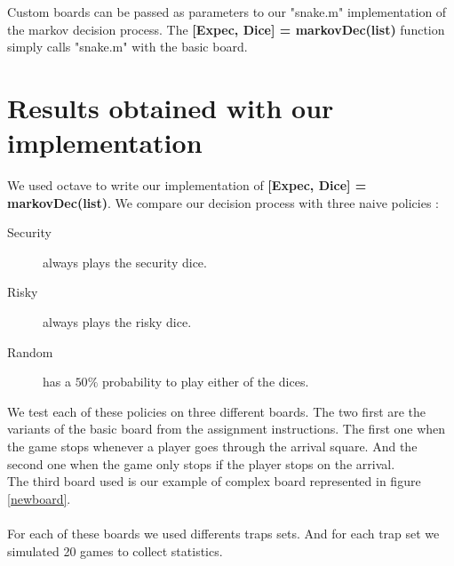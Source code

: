 \documentclass{eplDoc}
\begin{document}
Custom boards can be passed as parameters to our "snake.m" implementation of the markov decision process. The \textbf{[Expec, Dice] = markovDec(list)} function simply calls "snake.m" with the basic board. 

\section{Results obtained with our implementation}

We used octave to write our implementation of \textbf{[Expec, Dice] = markovDec(list)}. We compare our decision process with three naive policies :
 
\begin{description}
	\item[Security] always plays the security dice.
	\item[Risky] always plays the risky dice.
	\item[Random] has a $50\%$ probability to play either of the dices.
\end{description}
 
We test each of these policies on three different boards. The two first are the variants of the basic board from the assignment instructions. The first one when the game stops whenever a player goes through the arrival square. And the second one when the game only stops if the player stops on the arrival. \\ 
The third board used is our example of complex board represented in figure \ref{newboard}. \\ \\ 
For each of these boards we used differents traps sets. And for each trap set we simulated 20 games to collect statistics. 
\end{document}
